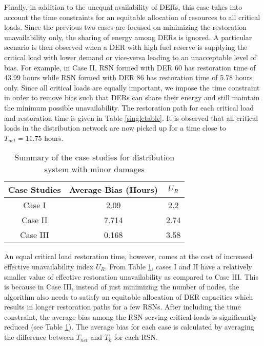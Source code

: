 \documentclass[12pt]{article}
\begin{document}
	Finally, in addition to the unequal availability of DERs, this case takes into account the time constraints for an equitable allocation of resources to all critical loads.
	Since the previous two cases are focused on minimizing the restoration unavailability only, the sharing of energy among DERs is ignored. A particular scenario is then observed when a DER with high fuel reserve is supplying the critical load with lower demand or vice-versa leading to an unacceptable level of bias. For example, in Case II, RSN formed with DER 60 has restoration time of 43.99 hours while RSN formed with DER 86 has restoration time of 5.78 hours only. Since all critical loads are equally important, we impose the time constraint in order to remove bias such that DERs can share their energy and still maintain the minimum possible unavailability. The restoration path for each critical load and restoration time is given in Table \ref{singletable}. It is observed that all critical loads in the distribution network are now picked up for a time close to $T_{net} = 11.75$ hours.
	
	\begin{table}[h]
\vspace{-0.1cm}
	\centering
	\caption{Summary of the case studies for distribution system with minor damages}
\vspace{-0.1cm}
	\label{discuss}
	\begin{tabular}{c|c|c}
		\hline
		\hline
		Case Studies & Average Bias (Hours) &  $U_R$\\
		\hline
		Case I& 2.09& 2.2\\
		Case II& 7.714&2.74\\
		Case III& 0.168&3.58\\
		\hline
		\hline
	\end{tabular}
	\vspace{-0.1 cm}	
\end{table}
	
		An equal critical load restoration time, however, comes at the cost of increased effective unavailability index $U_R$. From Table \ref{discuss}, cases I and II have a relatively smaller value of effective restoration unavailability as compared to Case III. This is because in Case III, instead of just minimizing the number of nodes, the algorithm also needs to satisfy an equitable allocation of DER capacities which results in longer restoration paths for a few RSNs. After including the time constraint, the average bias among the RSN serving critical loads is significantly reduced (see Table \ref{discuss}). The average bias for each case is calculated by averaging the difference between $T_{net}$ and $T_k$ for each RSN.
	
\end{document}
